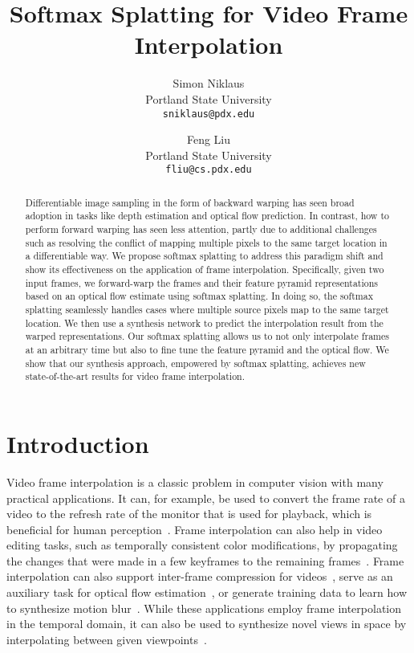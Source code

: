 \documentclass[10pt,twocolumn,letterpaper]{article}
\begin{document}
\title{Softmax Splatting for Video Frame Interpolation}

\author{Simon Niklaus\\
Portland State University\\
{\tt\small sniklaus@pdx.edu}
\and
Feng Liu\\
Portland State University\\
{\tt\small fliu@cs.pdx.edu}
}
\maketitle
\thispagestyle{empty}

\begin{abstract}

    Differentiable image sampling in the form of backward warping has seen broad adoption in tasks like depth estimation and optical flow prediction. In contrast, how to perform forward warping has seen less attention, partly due to additional challenges such as resolving the conflict of mapping multiple pixels to the same target location in a differentiable way. We propose softmax splatting to address this paradigm shift and show its effectiveness on the application of frame interpolation. Specifically, given two input frames, we forward-warp the frames and their feature pyramid representations based on an optical flow estimate using softmax splatting. In doing so, the softmax splatting seamlessly handles cases where multiple source pixels map to the same target location. We then use a synthesis network to predict the interpolation result from the warped representations. Our softmax splatting allows us to not only interpolate frames at an arbitrary time but also to fine tune the feature pyramid and the optical flow. We show that our synthesis approach, empowered by softmax splatting, achieves new state-of-the-art results for video frame interpolation.

\end{abstract}

\vspace{-0.2cm}\section{Introduction}
\label{sec:intro}
Video frame interpolation is a classic problem in computer vision with many practical applications. It can, for example, be used to convert the frame rate of a video to the refresh rate of the monitor that is used for playback, which is beneficial for human perception~\cite{Kuroki_OTHER_2007, Kuroki_OTHER_2014}. Frame interpolation can also help in video editing tasks, such as temporally consistent color modifications, by propagating the changes that were made in a few keyframes to the remaining frames~\cite{Meyer_BMVC_2018}. Frame interpolation can also support inter-frame compression for videos~\cite{Wu_ECCV_2018}, serve as an auxiliary task for optical flow estimation~\cite{Long_ECCV_2016, Wulff_OTHER_2018}, or generate training data to learn how to synthesize motion blur~\cite{Brooks_CVPR_2019}. While these applications employ frame interpolation in the temporal domain, it can also be used to synthesize novel views in space by interpolating between given viewpoints~\cite{Kalantari_TOG_2016}.
\end{document}
